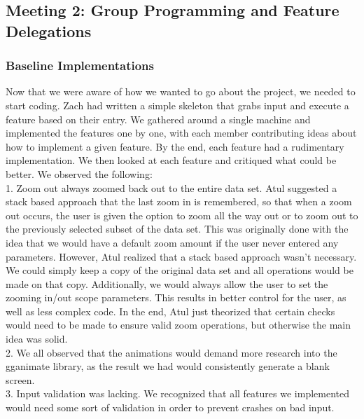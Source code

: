 \documentclass{article}
\begin{document}
\subsection{Meeting 2: Group Programming and Feature Delegations}
\subsubsection{Baseline Implementations}
Now that we were aware of how we wanted to go about the project, we needed to start coding. Zach had written a simple skeleton that grabs input and execute a feature based on their entry. We gathered around a single machine and implemented the features one by one, with each member contributing ideas about how to implement a given feature. By the end, each feature had a rudimentary implementation. We then looked at each feature and critiqued what could be better. We observed the following: \\
1. Zoom out always zoomed back out to the entire data set. Atul suggested a stack based approach that the last zoom in is remembered, so that when a zoom out occurs, the user is given the option to zoom all the way out or to zoom out to the previously selected subset of the data set. This was originally done with the idea that we would have a default zoom amount if the user never entered any parameters. However, Atul realized that a stack based approach wasn't necessary. We could simply keep a copy of the original data set and all operations would be made on that copy. Additionally, we would always allow the user to set the zooming in/out scope parameters. This results in better control for the user, as well as less complex code. In the end, Atul just theorized that certain checks would need to be made to ensure valid zoom operations, but otherwise the main idea was solid.\\
2. We all observed that the animations would demand more research into the gganimate library, as the result we had would consistently generate a blank screen.\\
3. Input validation was lacking. We recognized that all features we implemented would need some sort of validation in order to prevent crashes on bad input.
\end{document}
